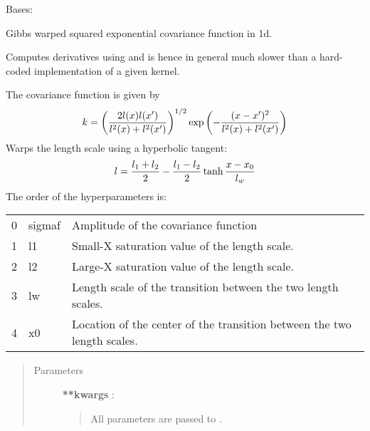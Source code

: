 \documentclass[letterpaper,10pt,english]{sphinxmanual}
\begin{document}
\begin{fulllineitems}
\label{gptools.kernel:gptools.kernel.gibbs.GibbsKernel1dTanhArb}
Bases: {\hyperref[gptools.kernel:gptools.kernel.core.ArbitraryKernel]{}}

Gibbs warped squared exponential covariance function in 1d.

Computes derivatives using  and is hence in general
much slower than a hard-coded implementation of a given kernel.

The covariance function is given by
\begin{gather}
\begin{split}k = \left ( \frac{2l(x)l(x')}{l^2(x)+l^2(x')} \right )^{1/2}\exp\left ( -\frac{(x-x')^2}{l^2(x)+l^2(x')} \right )\end{split}\notag
\end{gather}
Warps the length scale using a hyperbolic tangent:
\begin{gather}
\begin{split}l = \frac{l_1 + l_2}{2} - \frac{l_1 - l_2}{2}\tanh\frac{x-x_0}{l_w}\end{split}\notag
\end{gather}
The order of the hyperparameters is:

\begin{tabulary}{\linewidth}{|L|L|L|}
\hline

0
 & 
sigmaf
 & 
Amplitude of the covariance function
\\

1
 & 
l1
 & 
Small-X saturation value of the length scale.
\\

2
 & 
l2
 & 
Large-X saturation value of the length scale.
\\

3
 & 
lw
 & 
Length scale of the transition between the two length scales.
\\

4
 & 
x0
 & 
Location of the center of the transition between the two length scales.
\\
\hline\end{tabulary}

\begin{quote}\begin{description}
\item[{Parameters}] \leavevmode
\textbf{**kwargs} :
\begin{quote}

All parameters are passed to {\hyperref[gptools.kernel:gptools.kernel.core.Kernel]{}}.
\end{quote}

\end{description}\end{quote}

\end{fulllineitems}
\end{document}
